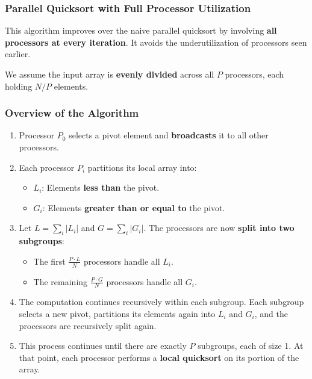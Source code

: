 \documentclass[12pt]{book}
\begin{document}
\subsubsection*{Parallel Quicksort with Full Processor Utilization}

This algorithm improves over the naive parallel quicksort by involving \textbf{all processors at every iteration}. It avoids the underutilization of processors seen earlier.

We assume the input array is \textbf{evenly divided} across all $P$ processors, each holding $N/P$ elements.

\subsubsection*{Overview of the Algorithm}

\begin{enumerate}
    \item Processor $P_0$ selects a pivot element and \textbf{broadcasts} it to all other processors.
    
    \item Each processor $P_i$ partitions its local array into:
    \begin{itemize}
        \item $L_i$: Elements \textbf{less than} the pivot.
        \item $G_i$: Elements \textbf{greater than or equal to} the pivot.
    \end{itemize}
    
    \item Let $L = \sum_i |L_i|$ and $G = \sum_i |G_i|$. The processors are now \textbf{split into two subgroups}:
    \begin{itemize}
        \item The first $\frac{P \cdot L}{N}$ processors handle all $L_i$.
        \item The remaining $\frac{P \cdot G}{N}$ processors handle all $G_i$.
    \end{itemize}
    
    \item The computation continues recursively within each subgroup. Each subgroup selects a new pivot, partitions its elements again into $L_i$ and $G_i$, and the processors are recursively split again.

    \item This process continues until there are exactly $P$ subgroups, each of size 1. At that point, each processor performs a \textbf{local quicksort} on its portion of the array.
\end{enumerate}
\end{document}

